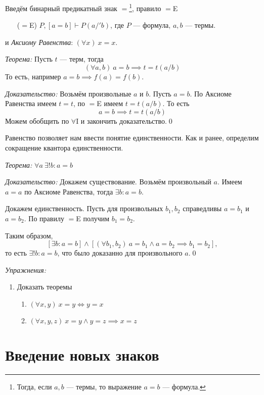 Введём бинарный предикатный знак $=$\footnote{
  Тогда, если $a,b$	 --- термы, то выражение $a=b$ --- формула.},
правило $=$E
\begin{enumerate}
  \item[($=$E)]{}$P,[a=b]\vdash P(a/'b)$,
  где $P$ --- формула, $a,b$ --- термы.
\end{enumerate}
и {\it Аксиому Равенства}: $(\forall x)~x=x$.

\vspace{1em}
{\it Теорема:} Пусть $t$ --- терм, тогда
\[
  (\forall a,b)~a=b\implies t=t(a/b)
\]
То есть, например $a=b\implies f(a)=f(b)$.

  {\it Доказательство:}
Возьмём произвольные $a$ и $b$. Пусть $a=b$.
По Аксиоме Равенства имеем $t=t$, по $=$E имеем $t=t(a/b)$.
То есть
\[
  a=b\implies t=t(a/b)
\]
Можем обобщить по $\forall$I и закончить доказательство.\qed

\pagebreak

Равенство позволяет нам ввести понятие единственности.
Как и ранее, определим сокращение квантора единственности.

{\it Теорема:} $\forall a~\exists !b:a=b$

{\it Доказательство:}
Докажем существование.
Возьмём произвольный $a$. Имеем $a=a$ по Аксиоме Равенства,
тогда $\exists b:a=b$.

Докажем единственность. Пусть для произвольных $b_1,b_2$
справедливы $a=b_1$ и $a=b_2$.
По правилу $=$E получим $b_1=b_2$.

Таким образом,
\[
  [\exists b:a=b]\land[(\forall b_1,b_2)~a=b_1\land a=b_2\implies b_1=b_2],
\]
то есть $\exists !b:a=b$, что было доказанно для произвольного $a$.\qed

\vspace{1em}
{\it Упражнения:}
\begin{enumerate}
  \item{}Доказать теоремы
  \begin{enumerate}
    \item{}$(\forall x,y)~x=y\iff y=x$
    \item{}$(\forall x,y,z)~x=y\land y=z\implies x=z$
  \end{enumerate}
\end{enumerate}

\section{Введение новых знаков}

